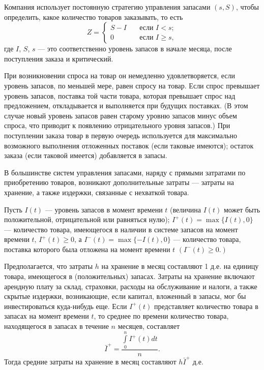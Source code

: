 Компания использует постоянную стратегию управления запасами
$(s,S)$, чтобы определить, какое количество товаров заказывать, то
есть
\begin{equation*}
Z=\left\{
\begin{array}{cc}
S-I & \quad \text{если } I<s;\\
0 & \quad \text{если } I\geqslant s,
\end{array}
\right.
\end{equation*}
где $I$, $S$, $s$ --- это соответственно уровень запасов в начале
месяца, после поступления заказа и критический.

При возникновении спроса на товар он немедленно удовлетворяется,
если уровень запасов, по меньшей мере, равен спросу на товар. Если
спрос превышает уровень запасов, поставка той части товара,
которая превышает спрос над предложением, откладывается и
выполняется при будущих поставках. (В этом случае новый уровень
запасов равен старому уровню запасов минус объем спроса, что
приводит к появлению отрицательного уровня запасов.) При
поступлении заказа товар в первую очередь используется для
максимально возможного выполнения отложенных поставок (если
таковые имеются); остаток заказа (если таковой имеется)
добавляется в запасы.

В большинстве систем управления запасами, наряду с прямыми
затратами по приобретению товаров, возникают дополнительные
затраты --- затраты на хранение, а также издержки, связанные с
нехваткой товара.

Пусть $I(t)$ --- уровень запасов в момент времени $t$ (величина
$I(t)$ может быть положительной, отрицательной или равняться
нулю); $I^{+}(t)=\max\{I(t),0\}$ --- количество товара, имеющегося
в наличии в системе запасов на момент времени $t$,
$I^{+}(t)\geqslant 0$, а $I^{-}(t)=\max\{-I(t),0\}$ --- количество
товара, поставка которого была отложена на момент времени $t$
$(I^{-}(t)\geqslant 0.)$

Предполагается, что затраты $h$ на хранение в месяц составляют 1
д.е. на единицу товара, имеющегося в (положительных) запасах.
Затраты на хранение включают арендную плату за склад, страховки,
расходы на обслуживание и налоги, а также скрытые издержки,
возникающие, если капитал, вложенный в запасы, мог бы
инвестироваться куда-нибудь еще. Если $I^{+}(t)$ представляет
количество товара в запасах на момент времени $t$, то среднее по
времени количество товара, находящегося в запасах в течение $n$
месяцев, составляет
\begin{equation*}
\bar{I}^+=\dfrac{\int\limits_0^nI^+(t)dt}{n}.
\end{equation*}
Тогда средние затраты на хранение в месяц составляют $h\bar{I}^+$
д.е.

